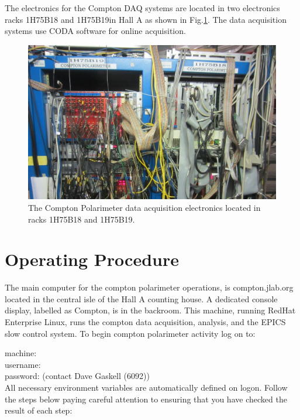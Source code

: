 The electronics for the Compton DAQ systems are located in two electronics racks  1H75B18 and 1H75B19in Hall A as shown in  Fig.\ref{fig:compton_daq_racks}. The data acquisition systems use CODA\cite{compton_CODA} software for online acquisition.

 \begin{figure}[htp]
    \begin{center}
        \includegraphics*[angle=0,scale=.45]{compton_daq_racks}
    \end{center}
    \caption[compton:electron detector]{
            The Compton Polarimeter data acquisition electronics located in racks 1H75B18 and 1H75B19.
            }
    \label{fig:compton_daq_racks}
 \end{figure}


\section {Operating Procedure }
\label{sec:compton_oper}

The main  computer for the compton polarimeter operations, is compton.jlab.org located
in the central isle of the Hall A counting house. A dedicated console display, labelled as Compton,
is in the backroom. This machine, running RedHat Enterprise Linux, runs the compton data acquisition,
analysis, and the EPICS~\cite{EPICSwww} slow control system. To begin compton polarimeter activity log on to:


\noindent machine:  \\
username: \\
password: \mycomp{*******}(contact Dave Gaskell (6092))\\

All necessary environment variables are automatically defined on logon. Follow the steps below
paying careful attention to ensuring that you have checked the result of each step:


